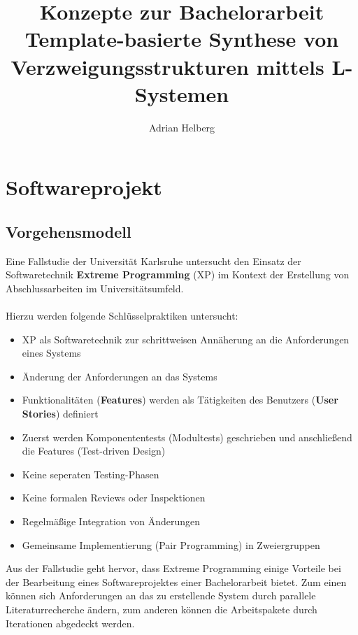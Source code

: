 \documentclass[11pt]{article}
\title{\textbf{Konzepte} zur Bachelorarbeit\\\large{Template-basierte Synthese von\\Verzweigungsstrukturen mittels
L-Systemen}}
\author{Adrian Helberg}
\begin{document}
    \maketitle
    \tableofcontents
    \newpage
    \section{Softwareprojekt}
    \subsection{Vorgehensmodell}
    Eine Fallstudie der Universität Karlsruhe\cite{1} untersucht den Einsatz der Softwaretechnik \textbf{Extreme Programming}
    (XP) im Kontext der Erstellung von Abschlussarbeiten im Universitätsumfeld.\\~\\
    Hierzu werden folgende Schlüsselpraktiken untersucht:
    \begin{itemize}
        \item XP als Softwaretechnik zur schrittweisen Annäherung an die Anforderungen eines Systems
        \item Änderung der Anforderungen an das Systems
        \item Funktionalitäten (\textbf{Features}) werden als Tätigkeiten des Benutzers (\textbf{User Stories}) definiert
        \item Zuerst werden Komponententests (Modultests) geschrieben und anschließend die Features (Test-driven Design)
        \item Keine seperaten Testing-Phasen
        \item Keine formalen Reviews oder Inspektionen
        \item Regelmäßige Integration von Änderungen
        \item Gemeinsame Implementierung (Pair Programming) in Zweiergruppen
    \end{itemize}
    Aus der Fallstudie geht hervor, dass Extreme Programming einige Vorteile bei der Bearbeitung eines Softwareprojektes
    einer Bachelorarbeit bietet.
    Zum einen können sich Anforderungen an das zu erstellende System durch parallele Literaturrecherche ändern, zum
    anderen können die Arbeitspakete durch Iterationen abgedeckt werden.
    \newpage
\end{document}
